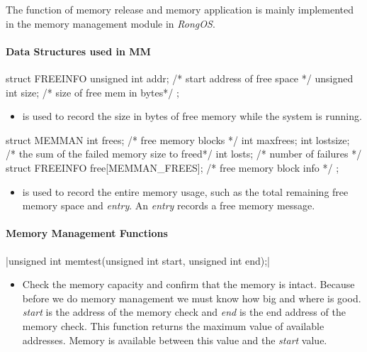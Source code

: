 \documentclass{swfcthesis}
\begin{document}
The function of memory release and memory application is mainly implemented in the memory
management module in \emph{RongOS}.


\paragraph{Data Structures used in MM}

\begin{codeblock}[1]
\begin{ccode}
struct FREEINFO
{ 
  unsigned int addr; /* start address of free space */
  unsigned int size; /* size of free mem in bytes*/
};
\end{ccode}
\end{codeblock}
\begin{itemize}
\item %
  is used to record the size in bytes of free memory while
  the system is running.
\end{itemize}

\begin{codeblock}[1]
\begin{ccode}
struct MEMMAN
{ 
  int frees;    /* free memory blocks */
  int maxfrees; 
  int lostsize; /* the sum of the failed memory size to freed*/
  int losts;    /* number of failures */
  struct FREEINFO free[MEMMAN_FREES]; /* free memory block info */
};
\end{ccode}
\end{codeblock}
\begin{itemize}
\item is used to record the entire
  memory usage, such as the total remaining free memory space and \emph{entry}. An
  \emph{entry} records a free memory message.
  
\end{itemize}

\paragraph{Memory Management Functions}
\csingle|unsigned int memtest(unsigned int start, unsigned int end);|
\begin{itemize}
\item Check the memory capacity and confirm that the memory is intact. Because before we
  do memory management we must know how big and where is good. \emph{start} is the 
  address of the memory check and \emph{end} is the end address of the memory
  check. This function returns the maximum value of available addresses. Memory is
  available between this value and the \emph{start} value.
\end{itemize}
\end{document}

